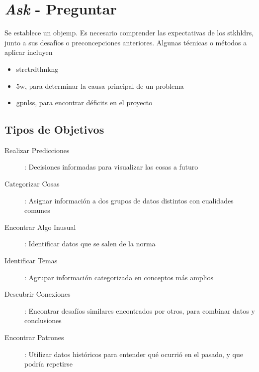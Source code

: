
\section{\textit{Ask} - Preguntar}
Se establece un \gls{objemp}. Es necesario comprender las expectativas de los \gls{stkhldrs}, junto a sus desafíos o preconcepciones anteriores. Algunas técnicas o métodos a aplicar incluyen
\begin{itemize}
    \item {\gls{strctrdthnkng}}
    \item {\gls{5w}, para determinar la causa principal de un problema}
    \item {\gls{gpnlss}, para encontrar déficits en el proyecto}
\end{itemize}

\subsection{Tipos de Objetivos}
\begin{description}
    \item [Realizar Predicciones]{ : Decisiones informadas para visualizar las cosas a futuro}
    \item [Categorizar Cosas]{ : Asignar información a dos grupos de datos distintos con cualidades comunes}
    \item [Encontrar Algo Inusual]{ : Identificar datos que se salen de la norma}
    \item [Identificar Temas]{ : Agrupar información categorizada en conceptos más amplios}
    \item [Descubrir Conexiones]{ : Encontrar desafíos similares encontrados por otros, para combinar datos y conclusiones}
    \item [Encontrar Patrones]{ : Utilizar datos históricos para entender qué ocurrió en el pasado, y que podría repetirse}
\end{description}


